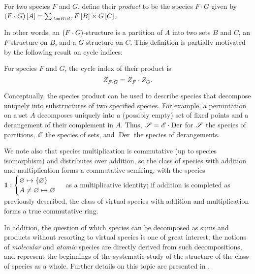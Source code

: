 \documentclass[distribution,draft]{brandiss} %
\numberwithin{section}{chapter}
\numberwithin{figure}{chapter}
\begin{document}
\begin{definition}\label{thm:specprod}
  For two species $F$ and $G$, define their \emph{product} to be the species $F \cdot G$ given by $\left( {F \cdot G} \right) \left[ {A} \right] = \sum_{A = B \sqcup C} F \left[ {B} \right] \times G \left[ {C} \right]$.
\end{definition}
In other words, an $\left( {F \cdot G} \right)$-structure is a partition of $A$ into two sets $B$ and $C$, an $F$-structure on $B$, and a $G$-structure on $C$.
This definition is partially motivated by the following result on cycle indices:
\begin{theorem}\label{thm:specprodci}
  For species $F$ and $G$, the cycle index of their product is
  \begin{equation}
    \label{eq:specprodci}
     Z_{F \cdot G}^{}  =  Z_{F}^{}  \cdot  Z_{G}^{} .
  \end{equation}
\end{theorem}

Conceptually, the species product can be used to describe species that decompose uniquely into substructures of two specified species.
For example, a permutation on a set $A$ decomposes uniquely into a (possibly empty) set of fixed points and a derangement of their complement in $A$.
Thus, $\mathscr{S} = \mathscr{E} \cdot \operatorname{Der}$ for $\mathscr{S}$ the species of partitions, $\mathscr{E}$ the species of sets, and $\operatorname{Der}$ the species of derangements.

We note also that species multiplication is commutative (up to species isomorphism) and distributes over addition, so the class of species with addition and multiplication forms a commutative semiring, with the species $\mathbf{1}: \begin{cases} \varnothing \mapsto \left\{ {\varnothing} \right\} \\ A \neq \varnothing \mapsto \varnothing \end{cases}$ as a multiplicative identity; if addition is completed as previously described, the class of virtual species with addition and multiplication forms a true commutative ring.

In addition, the question of which species can be decomposed as sums and products without resorting to virtual species is one of great interest; the notions of \emph{molecular} and \emph{atomic} species are directly derived from such decompositions, and represent the beginnings of the systematic study of the structure of the class of species as a whole.
Further details on this topic are presented in \cite[\S 2.6]{bll:species}.
\end{document}
